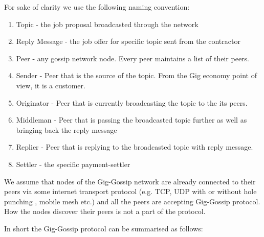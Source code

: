 \documentclass{article}
\begin{document}
For sake of clarity we use the following naming convention:

\begin{enumerate}
	\item Topic - the job proposal broadcasted through the network
	\item Reply Message - the job offer for specific topic sent from the contractor
	\item Peer - any gossip network node. Every peer maintains a list of their peers.
	\item Sender - Peer that is the source of the topic. From the Gig economy point of view, it is a customer.
	\item Originator - Peer that is currently broadcasting the topic to the its peers.
	\item Middleman - Peer that is passing the broadcasted topic further as well as bringing back the reply message
	\item Replier - Peer that is replying to the broadcasted topic with reply message.
	\item Settler - the specific payment-settler
\end{enumerate}

We assume that nodes of the Gig-Gossip network are already connected to their peers via some internet transport protocol (e.g. TCP, UDP with or without hole punching \cite{WebRTC}, mobile mesh etc.) and all the peers are accepting Gig-Gossip protocol. How the nodes discover their peers is not a part of the protocol.

In short the Gig-Gossip protocol can be summarised as follows:
\end{document}
